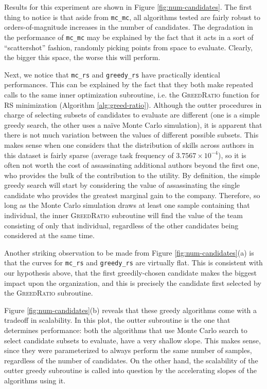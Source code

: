 Results for this experiment are shown in Figure \ref{fig:num-candidates}.
The first thing to notice is that aside from \texttt{mc\_mc}, all algorithms tested are fairly robust to orders-of-magnitude increases in the number of candidates.
The degradation in the performance of \texttt{mc\_mc} may be explained by the fact that it acts in a sort of ``scattershot'' fashion, randomly picking points from space to evaluate.
Clearly, the bigger this space, the worse this will perform.

Next, we notice that \texttt{mc\_rs} and \texttt{greedy\_rs} have practically identical performances.
This can be explained by the fact that they both make repeated calls to the same inner optimization subroutine, i.e. the \textsc{GreedRatio} function for RS minimization (Algorithm \ref{alg:greed-ratio}).
Although the outter procedures in charge of selecting subsets of candidates to evaluate are different (one is a simple greedy search, the other uses a na\"ive Monte Carlo simulation), it is apparent that there is not much variation between the values of different possible subsets.
This makes sense when one considers that the distribution of skills across authors in this dataset is fairly sparse (average task frequency of $ 3.7567 \times 10^{-4} $), so it is often not worth the cost of assassinating additional authors beyond the first one, who provides the bulk of the contribution to the utility.
By definition, the simple greedy search will start by considering the value of assassinating the single candidate who provides the greatest marginal gain to the company.
Therefore, so long as the Monte Carlo simulation draws at least one sample containing that individual, the inner \textsc{GreedRatio} subroutine will find the value of the team consisting of only that individual, regardless of the other candidates being considered at the same time.

Another striking observation to be made from Figure \ref{fig:num-candidates}(a) is that the curves for \texttt{mc\_rs} and \texttt{greedy\_rs} are virtually flat.
This is consistent with our hypothesis above, that the first greedily-chosen candidate makes the biggest impact upon the organization, and this is precisely the candidate first selected by the \textsc{GreedRatio} subroutine.

Figure \ref{fig:num-candidates}(b) reveals that these greedy algorithms come with a tradeoff in scalability.
In this plot, the outter subroutine is the one that determines performance: both the algorithms that use Monte Carlo search to select candidate subsets to evaluate, have a very shallow slope.
This makes sense, since they were parameterized to always perform the same number of samples, regardless of the number of candidates.
On the other hand, the scalability of the outter greedy subroutine is called into question by the accelerating slopes of the algorithms using it.

